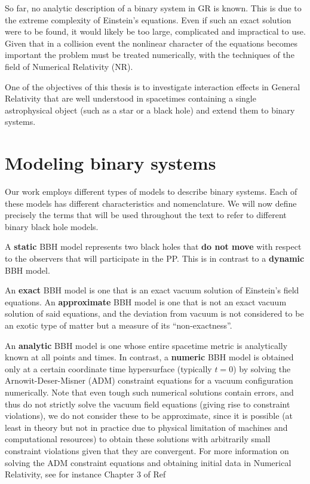 So far, no analytic description of a binary system in \ac{GR} is known. This is due to the extreme complexity of Einstein's equations. Even if such an exact solution were to be found, it would likely be too large, complicated and impractical to use. Given that in a collision event the nonlinear character of the equations becomes important the problem must be treated numerically, with the techniques of the field of Numerical Relativity (\ac{NR}).

One of the objectives of this thesis is to investigate interaction effects in General Relativity that are well understood in spacetimes containing a single astrophysical object (such as a star or a black hole) and extend them to binary systems.

\section*{Modeling binary systems}

Our work employs different types of models to describe binary systems. Each of these models has different characteristics and nomenclature.  We will now define precisely the terms that will be used throughout the text to refer to different binary black hole models.

\begin{definition}
  A \textbf{static} \ac{BBH} model represents two black holes that \textbf{do not move} with respect to the observers that will participate in the \ac{PP}. This is in contrast to a \textbf{dynamic} \ac{BBH} model.
\end{definition}

\begin{definition}
  An \textbf{exact} \ac{BBH} model is one that is an exact vacuum solution of Einstein's field equations. An \textbf{approximate} \ac{BBH} model is one that is not an exact vacuum solution of said equations, and the deviation from vacuum is not considered to be an exotic type of matter but a measure of its ``non-exactness''.
\end{definition}

\begin{definition}
  An \textbf{analytic} \ac{BBH} model is one whose entire spacetime metric is analytically known at all points and times. In contrast, a \textbf{numeric} \ac{BBH} model is obtained only at a certain coordinate time hypersurface (typically $t=0$) by solving the Arnowit-Deser-Misner (\ac{ADM}) constraint equations for a vacuum configuration numerically. Note that even tough such numerical solutions contain errors, and thus do not strictly solve the vacuum field equations (giving rise to constraint violations), we do not consider these to be approximate, since it is possible (at least in theory but not in practice due to physical limitation of machines and computational resources) to obtain these solutions with arbitrarily small constraint violations given that they are convergent. For more information on solving the \ac{ADM} constraint equations and obtaining initial data in Numerical Relativity, see for instance Chapter 3 of Ref~\cite{Alcubierre2012-xp}
\end{definition}


